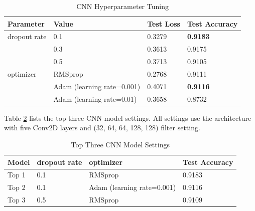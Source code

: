 \documentclass{article}
\begin{document}
\begin{table}[!ht]
    \centering
    \caption{CNN Hyperparameter Tuning}
    \label{tab:1-cnn-hy}
    \begin{tabular}{llll}
        \toprule
        \textbf{Parameter} & \textbf{Value} & \textbf{Test Loss} & \textbf{Test Accuracy}\\
        \midrule
        dropout rate & 0.1 & 0.3279 & \textbf{0.9183}\\
                     & 0.3 & 0.3613 & 0.9175\\
                     & 0.5 & 0.3713 & 0.9105\\
        \midrule
        optimizer & RMSprop & 0.2768 & 0.9111\\
                  & Adam (learning rate=0.001) & 0.4071 & \textbf{0.9116}\\
                  & Adam (learning rate=0.01) & 0.3658 & 0.8732\\
        \bottomrule
    \end{tabular}
\end{table}
\par 
Table \ref{tab:1-top3-cnn} lists the top three CNN model settings. All settings use the architecture with five Conv2D layers and (32, 64, 64, 128, 128) filter setting.

\begin{table}[!ht]
    \centering
    \caption{Top Three CNN Model Settings}
    \label{tab:1-top3-cnn}
    \begin{tabular}{llll}
        \toprule
        \textbf{Model} & \textbf{dropout rate} & \textbf{optimizer} & \textbf{Test Accuracy}\\
        \midrule
        Top 1 & 0.1 & RMSprop & 0.9183\\
        Top 2 & 0.1 & Adam (learning rate=0.001) & 0.9116\\
        Top 3 & 0.5 & RMSprop & 0.9109\\
        \bottomrule
    \end{tabular}
\end{table}
\end{document}
